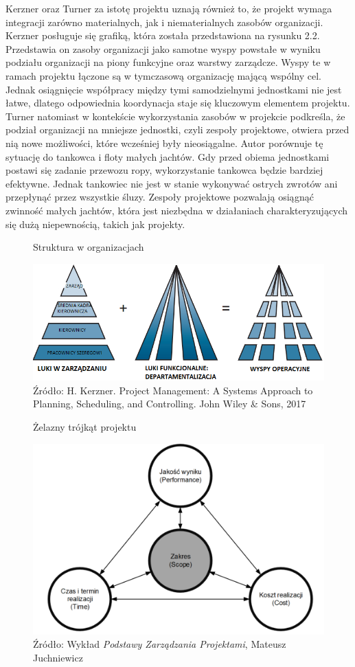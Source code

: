 Kerzner \autocite{Kerzner2017} oraz Turner \autocite{Turner2016} za istotę projektu uznają również to, że projekt wymaga integracji zarówno materialnych, jak i niematerialnych zasobów organizacji. Kerzner posługuje się grafiką, która została przedstawiona na rysunku 2.2. Przedstawia on zasoby organizacji jako samotne wyspy powstałe w wyniku podziału organizacji na piony funkcyjne oraz warstwy zarządcze. Wyspy te w ramach projektu łączone są w tymczasową organizację mającą wspólny cel. Jednak osiągnięcie współpracy między tymi samodzielnymi jednostkami nie jest łatwe, dlatego odpowiednia koordynacja staje się kluczowym elementem projektu. Turner natomiast w kontekście wykorzystania zasobów w projekcie podkreśla, że podział organizacji na mniejsze jednostki, czyli zespoły projektowe, otwiera przed nią nowe możliwości, które wcześniej były nieosiągalne. Autor porównuje tę sytuację do tankowca i floty małych jachtów. Gdy przed obiema jednostkami postawi się zadanie przewozu ropy, wykorzystanie tankowca będzie bardziej efektywne. Jednak tankowiec nie jest w stanie wykonywać ostrych zwrotów ani przepłynąć przez wszystkie śluzy. Zespoły projektowe pozwalają osiągnąć zwinność małych jachtów, która jest niezbędna w działaniach charakteryzujących się dużą niepewnością, takich jak projekty.
\begin{figure}
\centering
\caption{Struktura w organizacjach}
\includegraphics[width=16cm]{img/organizacja_PL.png}
\caption*{Źródło:  H. Kerzner. Project Management: A Systems Approach to Planning, Scheduling, and Controlling. John
Wiley \& Sons, 2017}
\end{figure}
\begin{figure}
\centering
\caption{Żelazny trójkąt projektu}
\includegraphics[width=14cm]{img/projekt2.png}
\caption*{Źródło: Wykład \textit{Podstawy Zarządzania Projektami}, Mateusz Juchniewicz}
\end{figure}

